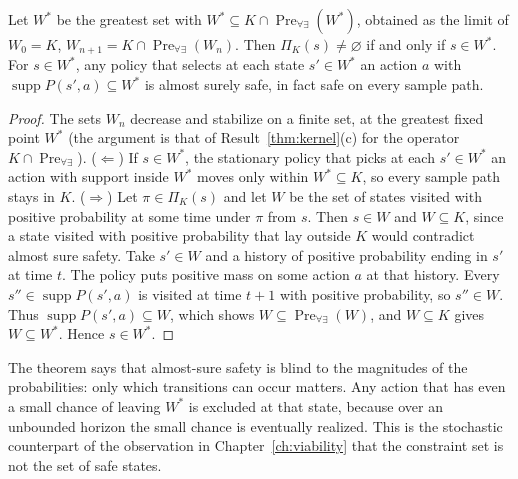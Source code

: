\begin{newresult}\label{thm:as-kernel}
Let $W^{*}$ be the greatest set with $W^{*}\subseteq K\cap\operatorname{Pre}_{\forall\exists}(W^{*})$, obtained as the limit of $W_0=K$, $W_{n+1}=K\cap\operatorname{Pre}_{\forall\exists}(W_n)$. Then $\Pi_K(s)\ne\varnothing$ if and only if $s\in W^{*}$. For $s\in W^{*}$, any policy that selects at each state $s'\in W^{*}$ an action $a$ with $\operatorname{supp}P(s',a)\subseteq W^{*}$ is almost surely safe, in fact safe on every sample path.
\end{newresult}
\begin{proof}
The sets $W_n$ decrease and stabilize on a finite set, at the greatest fixed point $W^{*}$ (the argument is that of Result~\ref{thm:kernel}(c) for the operator $K\cap\operatorname{Pre}_{\forall\exists}$). ($\Leftarrow$) If $s\in W^{*}$, the stationary policy that picks at each $s'\in W^{*}$ an action with support inside $W^{*}$ moves only within $W^{*}\subseteq K$, so every sample path stays in $K$. ($\Rightarrow$) Let $\pi\in\Pi_K(s)$ and let $W$ be the set of states visited with positive probability at some time under $\pi$ from $s$. Then $s\in W$ and $W\subseteq K$, since a state visited with positive probability that lay outside $K$ would contradict almost sure safety. Take $s'\in W$ and a history of positive probability ending in $s'$ at time $t$. The policy puts positive mass on some action $a$ at that history. Every $s''\in\operatorname{supp}P(s',a)$ is visited at time $t+1$ with positive probability, so $s''\in W$. Thus $\operatorname{supp}P(s',a)\subseteq W$, which shows $W\subseteq\operatorname{Pre}_{\forall\exists}(W)$, and $W\subseteq K$ gives $W\subseteq W^{*}$. Hence $s\in W^{*}$.
\end{proof}

The theorem says that almost-sure safety is blind to the magnitudes of the probabilities: only which transitions can occur matters. Any action that has even a small chance of leaving $W^{*}$ is excluded at that state, because over an unbounded horizon the small chance is eventually realized. This is the stochastic counterpart of the observation in Chapter~\ref{ch:viability} that the constraint set is not the set of safe states.

